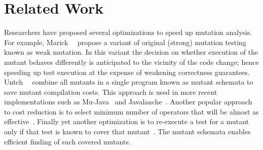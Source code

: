 \documentclass{sig-alternate}
\begin{document}






\section{Related Work}

Researchers have proposed several optimizations to speed up mutation
analysis.  For example, Marick~\etal~\cite{brian-marick-1991} propose
a variant of original (strong) mutation testing known as weak
mutation.  In this variant the decision on whether execution of the
mutant behaves differently is anticipated to the vicinity of the code
change; hence speeding up test execution at the expense of weakening
correctness guarantees.  Untch~\etal{}~\cite{untch-offut-harrold-1993}
combine all mutants in a single program known as mutant schemata to
save mutant compilation costs.  This approach is used in more recent
implementations such as Mu-Java~\cite{yu-seung-ma-etal-2005} and
Javalanche~\cite{schuler-zeller-fse-2009}.  Another popular approach
to cost reduction is to select minimum number of operators that will
be almost as
effective~\cite{millo-etal-1988,untch-offut-harrold-1993,offut-etal-1996,schuler-issta-2009}.
Finally yet another optimization is to re-execute a test for a mutant
only if that test is known to cover that
mutant~\cite{schuler-zeller-fse-2009}.  The mutant schemata enables
efficient finding of such covered mutants.
\end{document}
